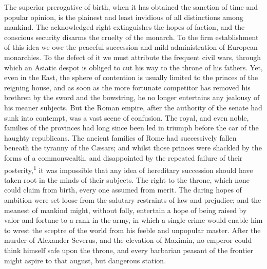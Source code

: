 The superior prerogative of birth, when it has obtained the
sanction of time and popular opinion, is the plainest and least
invidious of all distinctions among mankind. The acknowledged
right extinguishes the hopes of faction, and the conscious
security disarms the cruelty of the monarch. To the firm
establishment of this idea we owe the peaceful succession and
mild administration of European monarchies. To the defect of it
we must attribute the frequent civil wars, through which an
Asiatic despot is obliged to cut his way to the throne of his
fathers. Yet, even in the East, the sphere of contention is
usually limited to the princes of the reigning house, and as soon
as the more fortunate competitor has removed his brethren by the
sword and the bowstring, he no longer entertains any jealousy of
his meaner subjects. But the Roman empire, after the authority of
the senate had sunk into contempt, was a vast scene of confusion.
The royal, and even noble, families of the provinces had long
since been led in triumph before the car of the haughty
republicans. The ancient families of Rome had successively fallen
beneath the tyranny of the Cæsars; and whilst those princes were
shackled by the forms of a commonwealth, and disappointed by the
repeated failure of their posterity,\textsuperscript{1} it was impossible that any
idea of hereditary succession should have taken root in the minds
of their subjects. The right to the throne, which none could
claim from birth, every one assumed from merit. The daring hopes
of ambition were set loose from the salutary restraints of law
and prejudice; and the meanest of mankind might, without folly,
entertain a hope of being raised by valor and fortune to a rank
in the army, in which a single crime would enable him to wrest
the sceptre of the world from his feeble and unpopular master.
After the murder of Alexander Severus, and the elevation of
Maximin, no emperor could think himself safe upon the throne, and
every barbarian peasant of the frontier might aspire to that
august, but dangerous station.


